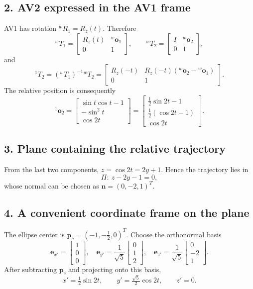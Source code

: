 \documentclass[11pt]{article}
\begin{document}
\subsection*{2. AV2 expressed in the AV1 frame}
AV1 has rotation \({}^{w}R_1=R_z(t)\). Therefore
\[
{}^{w}T_1=\begin{bmatrix}R_z(t)&{}^{w}\bm{o}_1\\0&1\end{bmatrix},\qquad
{}^{w}T_2=\begin{bmatrix}I&{}^{w}\bm{o}_2\\0&1\end{bmatrix},
\]
and
\[
{}^{1}T_2=({}^{w}T_1)^{-1}{}^{w}T_2
=\begin{bmatrix}
R_z(-t)&R_z(-t)({}^{w}\bm{o}_2-{}^{w}\bm{o}_1)\\0&1
\end{bmatrix}.
\]
The relative position is consequently
\[
{}^{1}\bm{o}_2=
\begin{bmatrix}
\sin t\cos t-1\\-\sin^2t\\\cos2t
\end{bmatrix}
=\begin{bmatrix}
\tfrac12\sin2t-1\\\tfrac12(\cos2t-1)\\\cos2t
\end{bmatrix}.
\]

\subsection*{3. Plane containing the relative trajectory}
From the last two components,
\(z=\cos2t=2y+1\). Hence the trajectory lies in
\[
\Pi:\ z-2y-1=0,
\]
whose normal can be chosen as \(\bm{n}=(0,-2,1)^T\).

\subsection*{4. A convenient coordinate frame on the plane}
The ellipse center is
\(\bm{p}_c=(-1,-\tfrac12,0)^T\). Choose the orthonormal basis
\[
\bm{e}_{x'}=\begin{bmatrix}1\\0\\0\end{bmatrix},\quad
\bm{e}_{y'}=\frac1{\sqrt5}\begin{bmatrix}0\\1\\2\end{bmatrix},\quad
\bm{e}_{z'}=\frac1{\sqrt5}\begin{bmatrix}0\\-2\\1\end{bmatrix}.
\]
After subtracting \(\bm{p}_c\) and projecting onto this basis,
\[
x'=\tfrac12\sin2t,\qquad
y'=\tfrac{\sqrt5}{2}\cos2t,\qquad z'=0.
\]
\end{document}
